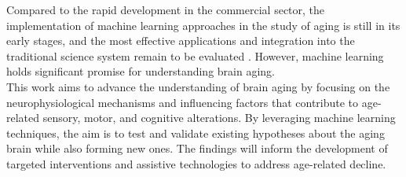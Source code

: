 Compared to the rapid development in the commercial sector, the implementation of machine learning approaches in the study of aging is still in its early stages, and the most effective applications and integration into the traditional science system remain to be evaluated \cite{Bzdok2019}. However, machine learning holds significant promise for understanding brain aging.\\
This work aims to advance the understanding of brain aging by focusing on the neurophysiological mechanisms and influencing factors that contribute to age-related sensory, motor, and cognitive alterations. By leveraging machine learning techniques, the aim is to test and validate existing hypotheses about the aging brain while also forming new ones. The findings will inform the development of targeted interventions and assistive technologies to address age-related decline.

